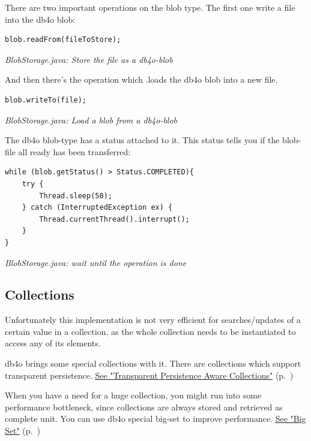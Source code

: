 There are two important operations on the blob type. The first one write a file into the db4o blob:

\begin{lstlisting}
blob.readFrom(fileToStore);
\end{lstlisting}

{\small\itshape BlobStorage.java: Store the file as a db4o-blob\par}
\medskip

And then there's the operation which .loads the db4o blob into a new file.

\begin{lstlisting}
blob.writeTo(file);
\end{lstlisting}

{\small\itshape BlobStorage.java: Load a blob from a db4o-blob\par}
\medskip

The db4o blob-type has a status attached to it. This status tells you if the blob-file all ready has been transferred:

\begin{lstlisting}
while (blob.getStatus() > Status.COMPLETED){
    try {
        Thread.sleep(50);
    } catch (InterruptedException ex) {
        Thread.currentThread().interrupt();
    }
}
\end{lstlisting}

{\small\itshape BlobStorage.java: wait until the operation is done\par}
\medskip

\subsection{Collections}
\label{ref:advanced-topics-type-handling-collections}

Unfortunately this implementation is not very efficient for searches/updates of a certain value in a collection, as the whole collection needs to be instantiated to access any of its elements.

db4o brings some special collections with it. There are collections which support transparent persistence. \hyperref[ref:basics-transparentpersistence-collections]{See "Transparent Persistence Aware Collections"} (p.~\pageref{ref:basics-transparentpersistence-collections})

When you have a need for a huge collection, you might run into some performance bottleneck, since collections are always stored and retrieved as complete unit. You can use db4o special big-set to improve performance. \hyperref[ref:advanced-topics-type-handling-collections-big-set]{See "Big Set"} (p.~\pageref{ref:advanced-topics-type-handling-collections-big-set})

